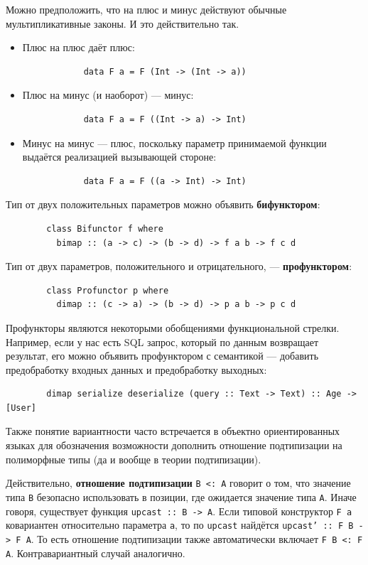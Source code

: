 \documentclass[12pt]{article}
\newcommand{\vocab}[1]{\textbf{#1}} %
\begin{document}
    Можно предположить, что на плюс и минус действуют обычные мультипликативные законы.
    И это действительно так.
    \begin{itemize}
        \item Плюс на плюс даёт плюс:
        \begin{verbatim}
            data F a = F (Int -> (Int -> a))
        \end{verbatim}
        \item Плюс на минус (и наоборот) --- минус:
        \begin{verbatim}
            data F a = F ((Int -> a) -> Int)
        \end{verbatim}
        \item Минус на минус --- плюс, поскольку параметр принимаемой функции выдаётся реализацией вызывающей стороне:
        \begin{verbatim}
            data F a = F ((a -> Int) -> Int)
        \end{verbatim}
    \end{itemize}

    Тип от двух положительных параметров можно объявить \vocab{бифунктором}:
    \begin{verbatim}
        class Bifunctor f where
          bimap :: (a -> c) -> (b -> d) -> f a b -> f c d
    \end{verbatim}

    Тип от двух параметров, положительного и отрицательного, --- \vocab{профунктором}:
    \begin{verbatim}
        class Profunctor p where
          dimap :: (c -> a) -> (b -> d) -> p a b -> p c d
    \end{verbatim}

    Профункторы являются некоторыми обобщениями функциональной стрелки.
    Например, если у нас есть SQL запрос, который по данным возвращает результат, его можно объявить профунктором с семантикой --- добавить предобработку входных данных и предобработку выходных:
    \begin{verbatim}
        dimap serialize deserialize (query :: Text -> Text) :: Age -> [User]
    \end{verbatim}

    Также понятие вариантности часто встречается в объектно ориентированных языках для обозначения возможности дополнить отношение подтипизации на полиморфные типы (да и вообще в теории подтипизации).

    Действительно, \vocab{отношение подтипизации} \texttt{B <: A} говорит о том, что значение типа \texttt{B} безопасно использовать в позиции, где ожидается значение типа \texttt{A}.
    Иначе говоря, существует функция \texttt{upcast :: B -> A}.
    Если типовой конструктор \texttt{F a} ковариантен относительно параметра \texttt{a}, то по \texttt{upcast} найдётся \texttt{upcast' :: F B -> F A}.
    То есть отношение подтипизации также автоматически включает \texttt{F B <: F A}.
    Контравариантный случай аналогично.
\end{document}
